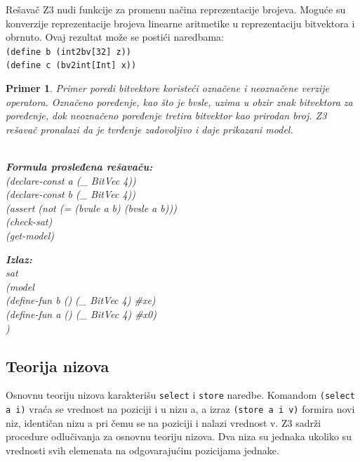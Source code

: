 \documentclass[12pt,oneside]{memoir}
\newcommand\tab[1][0.5cm]{\hspace*{#1}}
\newtheorem{primer}{Primer}
\begin{document}
Rešavač Z3 nudi funkcije za promenu načina reprezentacije brojeva. Moguće su konverzije reprezentacije brojeva linearne aritmetike u reprezentaciju bitvektora i obrnuto. Ovaj rezultat može se postići naredbama: \\
\texttt{(define b (int2bv[32] z))} \\  
\texttt{(define c (bv2int[Int] x))} 
\begin{primer} Primer poredi bitvektore koristeći označene i neoznačene verzije operatora. Označeno poređenje, kao što je bvsle, uzima u obzir znak bitvektora za poređenje, dok neoznačeno poređenje tretira bitvektor kao prirodan broj. Z3 rešavač pronalazi da je tvrđenje zadovoljivo i daje prikazani model.
\\ \\
\begin{minipage}[b]{0.5\textwidth}
\textbf{Formula prosleđena rešavaču:}
\\(declare-const a (\_ BitVec 4))
\\(declare-const b (\_ BitVec 4))
\\(assert (not (= (bvule a b) (bvsle a b)))
\\(check-sat)
\\(get-model)
\end{minipage}
\hspace{1.15cm} 
\begin{minipage}[t]{0.5\textwidth}
\vspace{-3.45cm}
\textbf{Izlaz:}
\\sat 
\\(model 
\\\tab(define-fun b () (\_ BitVec 4) \#xe) 
\\\tab(define-fun a () (\_ BitVec 4) \#x0)
\\)
\end{minipage}


\end{primer}


\subsection{Teorija nizova} 
Osnovnu teoriju nizova karakterišu \texttt{select} i \texttt{store} naredbe. 
Komandom \texttt{(select a i)} vraća se vrednost na poziciji i u nizu a, a izraz \texttt{(store a i v)} formira novi niz, identičan nizu a pri čemu se na poziciji i nalazi vrednost v.
Z3 sadrži procedure odlučivanja za osnovnu teoriju nizova.
Dva niza su jednaka ukoliko su vrednosti svih elemenata na odgovarajućim pozicijama jednake.
 
\end{document}
